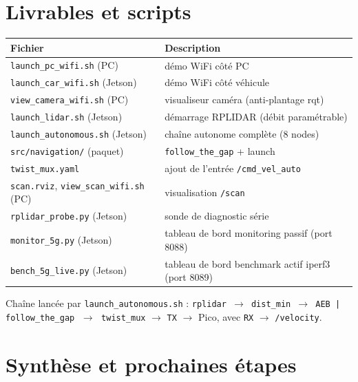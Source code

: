 \documentclass[a4paper,11pt]{article}
\begin{document}
\section{Livrables et scripts}
\begin{table}[H]
\centering
\begin{tabularx}{\textwidth}{@{}l X@{}}
\toprule
\textbf{Fichier} & \textbf{Description} \\
\midrule
\texttt{launch\_pc\_wifi.sh} (PC)        & démo WiFi côté PC \\
\texttt{launch\_car\_wifi.sh} (Jetson)   & démo WiFi côté véhicule \\
\texttt{view\_camera\_wifi.sh} (PC)      & visualiseur caméra (anti-plantage rqt) \\
\texttt{launch\_lidar.sh} (Jetson)       & démarrage RPLIDAR (débit paramétrable) \\
\texttt{launch\_autonomous.sh} (Jetson)  & chaîne autonome complète (8 nodes) \\
\texttt{src/navigation/} (paquet)        & \texttt{follow\_the\_gap} + launch \\
\texttt{twist\_mux.yaml}                 & ajout de l'entrée \texttt{/cmd\_vel\_auto} \\
\texttt{scan.rviz}, \texttt{view\_scan\_wifi.sh} (PC) & visualisation \texttt{/scan} \\
\texttt{rplidar\_probe.py} (Jetson)      & sonde de diagnostic série \\
\texttt{monitor\_5g.py} (Jetson)         & tableau de bord monitoring passif (port 8088) \\
\texttt{bench\_5g\_live.py} (Jetson)     & tableau de bord benchmark actif iperf3 (port 8089) \\
\bottomrule
\end{tabularx}
\end{table}
\noindent Chaîne lancée par \texttt{launch\_autonomous.sh} :
\texttt{rplidar $\rightarrow$ dist\_min $\rightarrow$ AEB \;|\; follow\_the\_gap}
$\;\rightarrow\;$ \texttt{twist\_mux} $\rightarrow$ \texttt{TX} $\rightarrow$ Pico,
avec \texttt{RX} $\rightarrow$ \texttt{/velocity}.

\section{Synthèse et prochaines étapes}\label{sec:next}
\end{document}
